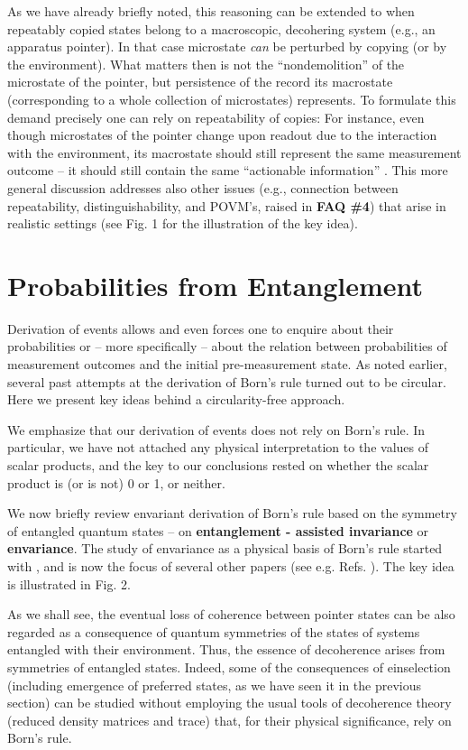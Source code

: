 \documentclass[aps,amsmath,amssymb,amsfonts,floatfix]{revtex4-1}
\newcommand{\+}         {\dagger}
\begin{document}
{As we have already briefly noted, this reasoning can be extended \cite{Z2013} to when repeatably copied states belong to a macroscopic, decohering system (e.g., an apparatus pointer). In that case microstate {\it can} be perturbed by copying (or by the environment). What matters then is not the ``nondemolition'' of the microstate of the pointer, but persistence of the record its macrostate (corresponding to a whole collection of microstates) represents. To formulate this demand precisely one can rely on repeatability of copies: For instance, even though microstates of the pointer change upon readout due to the interaction with the environment, its macrostate should still represent the same measurement outcome -- it should still contain the same ``actionable information'' \cite{Z2013}. This more general discussion addresses also other issues (e.g., connection between repeatability, distinguishability, and POVM's, raised in {\bf FAQ \#4}) that arise in realistic settings (see Fig. 1 for the illustration of the key idea). 



\section{Probabilities from Entanglement}

Derivation of events allows and even forces one to enquire about their probabilities or -- more specifically -- about the relation 
between probabilities of measurement outcomes and the initial pre-measurement state. 
As noted earlier, several past attempts at the derivation of Born's rule turned out
to be circular. Here we present key ideas behind a circularity-free approach. 


We emphasize that our derivation of events does not rely on Born's rule. In particular, we have not attached any physical interpretation to the values of scalar products, and the key to our conclusions rested on whether the scalar product is (or is not) 0 or 1, or neither.

We now briefly review envariant derivation of Born's rule based on the symmetry of
entangled quantum states -- on {\bf entanglement - assisted invariance} or {\bf envariance}.
The study of envariance as a physical basis of Born's rule started with \cite{76,78,75}, and is now the focus of
several other papers (see e.g. Refs. \cite{53,5,H}). The key idea is illustrated in Fig. 2.

As we shall see, the eventual loss of coherence between pointer states
can be also regarded as a consequence of quantum symmetries of the states of systems entangled
with their environment. Thus, the essence of decoherence arises from symmetries of entangled states.
Indeed, some of the consequences of einselection  (including emergence of preferred states, as we have seen it in the previous section) can be studied without
employing the usual tools of decoherence theory (reduced density matrices and trace) that, for their physical significance, rely on Born's rule.

}
\end{document}
